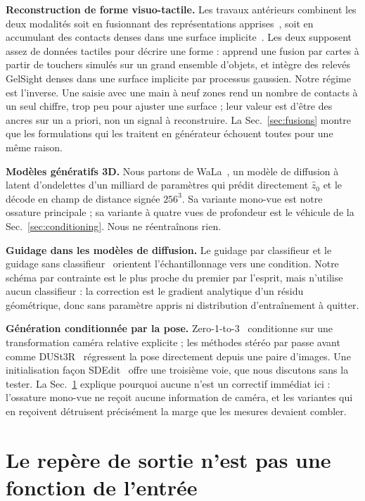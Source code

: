 \documentclass[conference]{IEEEtran}
\begin{document}
\textbf{Reconstruction de forme visuo-tactile.} Les travaux antérieurs combinent les
deux modalités soit en fusionnant des représentations apprises~\cite{smith2020,smith2021},
soit en accumulant des contacts denses dans une surface implicite~\cite{suresh2022}.
Les deux supposent assez de données tactiles pour décrire une forme :
\cite{smith2020} apprend une fusion par cartes à partir de touchers simulés sur un
grand ensemble d'objets, et \cite{suresh2022} intègre des relevés GelSight denses dans
une surface implicite par processus gaussien. Notre régime est l'inverse. Une saisie
avec une main à neuf zones rend un nombre de contacts à un seul chiffre, trop peu pour
ajuster une surface ; leur valeur est d'être des ancres sur un a priori, non un signal
à reconstruire. La Sec.~\ref{sec:fusions} montre que les formulations qui les traitent
en générateur échouent toutes pour une même raison.

\textbf{Modèles génératifs 3D.} Nous partons de WaLa~\cite{wala}, un modèle de
diffusion à latent d'ondelettes d'un milliard de paramètres qui prédit directement
$\hat{z}_0$ et le décode en champ de distance signée $256^3$. Sa variante mono-vue est
notre ossature principale ; sa variante à quatre vues de profondeur est le véhicule de
la Sec.~\ref{sec:conditioning}. Nous ne réentraînons rien.

\textbf{Guidage dans les modèles de diffusion.} Le guidage par classifieur
\cite{dhariwal} et le guidage sans classifieur~\cite{cfg} orientent l'échantillonnage
vers une condition. Notre schéma par contrainte est le plus proche du premier par
l'esprit, mais n'utilise aucun classifieur : la correction est le gradient analytique
d'un résidu géométrique, donc sans paramètre appris ni distribution d'entraînement à
quitter.

\textbf{Génération conditionnée par la pose.} Zero-1-to-3~\cite{zero123} conditionne
sur une transformation caméra relative explicite ; les méthodes stéréo par passe avant
comme DUSt3R~\cite{dust3r} régressent la pose directement depuis une paire d'images.
Une initialisation façon SDEdit~\cite{sdedit} offre une troisième voie, que nous
discutons sans la tester. La Sec.~\ref{sec:frame} explique pourquoi aucune n'est un
correctif immédiat ici : l'ossature mono-vue ne reçoit aucune information de caméra, et
les variantes qui en reçoivent détruisent précisément la marge que les mesures devaient
combler.

\section{Le repère de sortie n'est pas une fonction de l'entrée}
\label{sec:frame}
\end{document}
